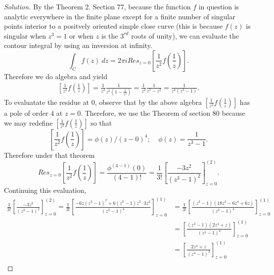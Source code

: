 \documentclass[11pt]{amsart}
\theoremstyle{definition}
\numberwithin{theorem}{section}
\numberwithin{definition}{section}
\numberwithin{equation}{section}
\newenvironment{solution}
  {\begin{proof}[Solution]}
  {\end{proof}}
\begin{document}
\begin{solution}
	By the Theorem 2. Section 77, because the function $f$ in question is analytic everywhere in the finite plane except for a finite number of singular points interior to a positvely oriented simple close curve (this is because $f(z)$ is singular when $z^3 = 1$ or when $z$ is the $3^{rd}$ roots of unity), we can evaluate the contour integral by using an inversion at infinity.
	\begin{equation*}
		\int_C f(z)\ dz = 2\pi i Res_{z = 0} \left[\frac{1}{z^2} f\left(\frac{1}{z}\right)\right].
	\end{equation*}
	Therefore we do algebra and yield
	\begin{equation*}
		\begin{aligned}
			\left[\frac{1}{z^2} f\left(\frac{1}{z}\right)\right] = \frac{1}{z^2} \frac{1}{z^5(1 - \frac{1}{z^3})} =  \frac{1}{z^2} \frac{1}{z^5 - z^2} = \frac{1}{z^4(z^3 - 1)}.
		\end{aligned}
	\end{equation*}
	To evaluatate the residue at $0$, observe that by the above algebra $\left[\frac{1}{z^2} f\left(\frac{1}{z}\right)\right]$ has a pole of order $4$ at $z = 0.$ Therefore, we use the Theorem of section $80$ because we may redefine
	$\left[\frac{1}{z^2} f\left(\frac{1}{z}\right)\right]$ so that
	\begin{equation*}
		\left[\frac{1}{z^2} f\left(\frac{1}{z}\right)\right] = \phi(z)/(z-0)^4;\;\;\;\;\phi(z) = \frac{1}{z^3 - 1}.
	\end{equation*}
	Therefore under that theorem
	\begin{equation*}
		Res_{z=0} \left[\frac{1}{z^2} f\left(\frac{1}{z}\right)\right]  = \frac{\phi^{(4-1)}(0)}{(4-1)!} = \frac{1}{3!}\left[\frac{-3z^2}{(z^3 - 1)^2}\right]^{(2)}_{z=0}.
	\end{equation*}
	Continuing this evaluation,
	\begin{equation*}
	\begin{aligned}
	\frac{1}{3!}\left[\frac{-3z^2}{(z^3 - 1)^2}\right]^{(2)}_{z=0} = \frac{1}{3!}\left[\frac{-6z(z^3-1)^2 + 6(z^3 - 1)z^2\cdot 3z^2}{(z^3 - 1)^4}\right]^{(1)}_{z=0} &= \frac{1}{3!}\left[\frac{(z^3 - 1)( 18z^4- 6z^4+6z)}{(z^3 - 1)^4}\right]^{(1)}_{z=0}\\
	&= \left[\frac{(z^3 - 1)( 2z^4 +z)}{(z^3 - 1)^4}\right]^{(1)}_{z=0}\\
	&= \left[\frac{ 2z^4 +z}{(z^3 - 1)^3}\right]^{(1)}_{z=0}\\
	\end{aligned}

\end{equation*}
\end{solution}
\end{document}

